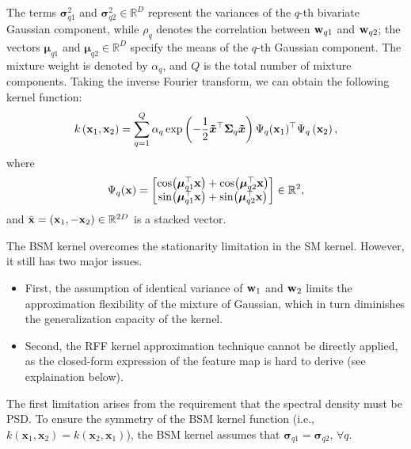 The terms $\bm{\sigma}_{q1}^2$ and $\bm{\sigma}_{q2}^2 \in \mathbb{R}^D$ represent the variances of the $q$-th bivariate Gaussian component, while $\rho_q$ denotes the correlation between ${\mathbf w}_{q1}$ and ${\mathbf w}_{q2}$;  the vectors $\boldsymbol{\mu}_{q1}$ and $\boldsymbol{\mu}_{q2} \in \mathbb{R}^D$ specify the means of the $q$-th Gaussian component. The mixture weight is denoted by $\alpha_q$, and $Q$ is the total number of mixture components. Taking the inverse Fourier transform, we can obtain the following kernel function:
\begin{align}
\label{eq:kernel_BSM_1}
k\left({\mathbf x}_1, {\mathbf x}_2\right) = \sum_{q=1}^Q \alpha_q \exp\left(-\frac{1}{2} \boldsymbol{\tilde{x}}^{\top} \boldsymbol \Sigma_q \boldsymbol{\tilde{x}}\right) \Psi_{q}({\mathbf x}_1)^\top \Psi_{q}\left({\mathbf x}_2\right),
\end{align}
where
$$
\Psi_{q}({\mathbf x}) = 
\begin{bmatrix}
\cos(\boldsymbol{\mu}_{q1}^\top {\mathbf x}) + \cos(\boldsymbol{\mu}_{q2}^\top {\mathbf x}) \\
\sin(\boldsymbol{\mu}_{q1}^\top {\mathbf x}) + \sin(\boldsymbol{\mu}_{q2}^\top {\mathbf x})
\end{bmatrix} \in \mathbb{R}^2,
$$
and $\tilde{{\mathbf x}} = ({\mathbf x}_1, -{\mathbf x}_2) \in \mathbb{R}^{2D}$ is a stacked vector.

The \MakeUppercase{bsm}  kernel overcomes the stationarity limitation in the \MakeUppercase{sm} kernel.
However, it still has two major issues.
\begin{itemize}
    \item First, the assumption of identical variance of ${\mathbf w}_1$ and ${\mathbf w}_2$ limits the approximation flexibility of the mixture of Gaussian, which in turn diminishes the generalization capacity of the kernel. 
    \item Second, the RFF kernel approximation technique cannot be directly applied, as the closed-form expression of the feature map is hard to derive (see explaination below).
\end{itemize}
The first limitation arises from the requirement that the spectral density must be PSD. To ensure the symmetry of the \MakeUppercase{bsm} kernel function (i.e., $k(\mathbf{x}_1, \mathbf{x}_2) = k(\mathbf{x}_2, \mathbf{x}_1)$), the \MakeUppercase{bsm} kernel assumes that $\bm{\sigma}_{q1} = \bm{\sigma}_{q2}, \, \forall q$.


